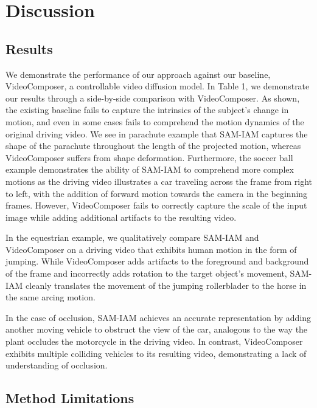 \section{Discussion}

\subsection{Results}
We demonstrate the performance of our approach against our baseline, VideoComposer, a controllable video diffusion model. In Table 1, we demonstrate our results through a side-by-side comparison with VideoComposer. As shown, the existing baseline fails to capture the intrinsics of the subject's change in motion, and even in some cases fails to comprehend the motion dynamics of the original driving video. We see in parachute example that SAM-IAM captures the shape of the parachute throughout the length of the projected motion, whereas VideoComposer suffers from shape deformation. Furthermore, the soccer ball example demonstrates the ability of SAM-IAM to comprehend more complex motions as the driving video illustrates a car traveling across the frame from right to left, with the addition of forward motion towards the camera in the beginning frames. However, VideoComposer fails to correctly capture the scale of the input image while adding additional artifacts to the resulting video.

In the equestrian example, we qualitatively compare SAM-IAM and VideoComposer on a driving video that exhibits human motion in the form of jumping. While VideoComposer adds artifacts to the foreground and background of the frame and incorrectly adds rotation to the target object's movement, SAM-IAM cleanly translates the movement of the jumping rollerblader to the horse in the same arcing motion.

In the case of occlusion, SAM-IAM achieves an accurate representation by adding another moving vehicle to obstruct the view of the car, analogous to the way the plant occludes the motorcycle in the driving video. In contrast, VideoComposer exhibits multiple colliding vehicles to its resulting video, demonstrating a lack of understanding of occlusion. 

\subsection{Method Limitations}

